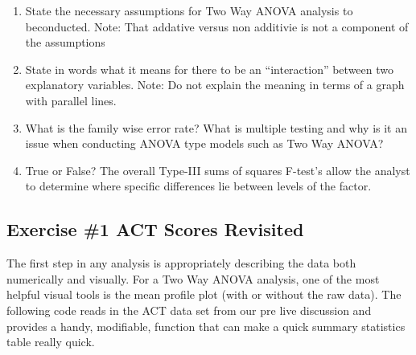 \documentclass[]{article}
\begin{document}
\begin{enumerate}
\def\labelenumi{\arabic{enumi}.}
\item
  State the necessary assumptions for Two Way ANOVA analysis to
  beconducted. Note: That addative versus non additivie is not a
  component of the assumptions
\item
  State in words what it means for there to be an ``interaction''
  between two explanatory variables. Note: Do not explain the meaning in
  terms of a graph with parallel lines.
\item
  What is the family wise error rate? What is multiple testing and why
  is it an issue when conducting ANOVA type models such as Two Way
  ANOVA?
\item
  True or False? The overall Type-III sums of squares F-test's allow the
  analyst to determine where specific differences lie between levels of
  the factor.
\end{enumerate}

\hypertarget{exercise-1-act-scores-revisited}{%
\subsection{Exercise \#1 ACT Scores
Revisited}\label{exercise-1-act-scores-revisited}}

The first step in any analysis is appropriately describing the data both
numerically and visually. For a Two Way ANOVA analysis, one of the most
helpful visual tools is the mean profile plot (with or without the raw
data). The following code reads in the ACT data set from our pre live
discussion and provides a handy, modifiable, function that can make a
quick summary statistics table really quick.
\end{document}
